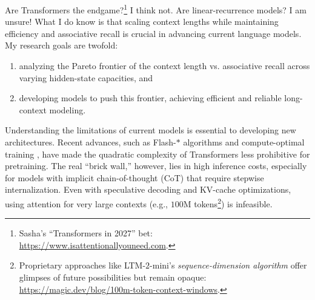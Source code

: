 
Are Transformers the endgame?\footnote{Sasha's ``Transformers in 2027'' bet: \url{https://www.isattentionallyouneed.com}.} I think not.
%
Are linear-recurrence models? I am unsure!
%
What I do know is that scaling context lengths while maintaining efficiency and associative recall is crucial in advancing current language models.
%
My research goals are twofold:
\begin{enumerate}[itemsep=-2pt, topsep=-1pt]
    \item analyzing the Pareto frontier of the context length vs. associative recall across varying hidden-state capacities, and
    \item developing models to push this frontier, achieving efficient and reliable long-context modeling.
\end{enumerate}

Understanding the limitations of current models is essential to developing new architectures.
%
Recent advances, such as Flash-$\ast$ algorithms \citep{fu_flashfftconv_2023,shah_flashattention-3_2024} and compute-optimal training \citep{muennighoff_scaling_2023}, have made the quadratic complexity of Transformers less prohibitive for pretraining.
%
The real ``brick wall,'' however, lies in high inference costs, especially for models with implicit chain-of-thought (CoT) that require stepwise internalization.
%
Even with speculative decoding and KV-cache optimizations, using attention for very large contexts (e.g., $100$M tokens\footnote{Proprietary approaches like LTM-$2$-mini's \textit{sequence-dimension algorithm} offer glimpses of future possibilities but remain opaque: \url{https://magic.dev/blog/100m-token-context-windows}.}) is infeasible.

